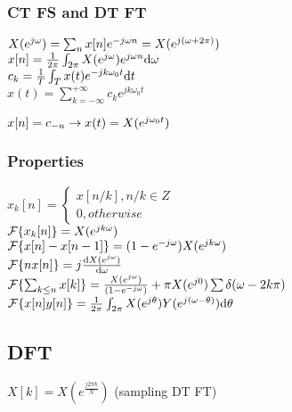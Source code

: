 \subsubsection*{CT FS and DT FT}

$X(e^{j\omega}) = \sum_n x[n] e^{-j\omega n} = X(e^{j(\omega + 2\pi)})$\\
$x[n] = \frac{1}{2\pi} \int_{2\pi} X(e^{j\omega}) e^{j\omega n} \mathrm{d} \omega$\\
$c_k=\frac 1 T \int_T x(t) e^{-jk\omega_0 t} \mathrm{d} t$\\
$x(t)=\sum_{k=-\infty}^{+\infty} c_k e^{jk\omega_0 t}$

$x[n]=c_{-n}\rightarrow x(t)=X(e^{j\omega_0 t})$

\subsubsection*{Properties}

$x_k[n] = \begin{cases}x[n/k], n/k\in Z\\0, otherwise \end{cases}$\\
$\mathcal{F}\{x_k[n]\} = X(e^{jk\omega})$\\
$\mathcal{F}\{x[n] - x[n - 1]\} = (1-e^{-j\omega}) X(e^{jk\omega})$\\
$\mathcal{F}\{nx[n]\} = j\frac{\mathrm{d} X(e^{j\omega})}{\mathrm{d} \omega}$\\
$\mathcal{F}\{\sum_{k\le n} x[k]\} = \frac{X(e^{j\omega})}{(1-e^{-j\omega})} + \pi X(e^{j0}) \sum \delta(\omega - 2k\pi)$\\
$\mathcal{F}\{x[n]y[n]\}=\frac{1}{2\pi} \int_{2\pi} X(e^{j\theta})Y(e^{j(\omega-\theta)})\mathrm{d} \theta$

\subsection{DFT}

$X[k]=X(e^{\frac{j2\pi k}{N}})$ (sampling DT FT)